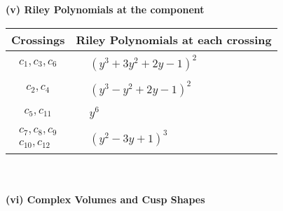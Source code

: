 \documentclass[1p]{elsarticle_modified}
\theoremstyle{definition}
\begin{document}
\newpage\renewcommand{\arraystretch}{1}
\flushleft \textbf{(v) Riley Polynomials at the component}\newline \\
\begin{tabular}{m{50pt}|m{274pt}}
Crossings & \hspace{64pt}Riley Polynomials at each crossing \\
\hline $$\begin{aligned}c_{1},c_{3},c_{6}\end{aligned}$$&$\begin{aligned}
&(y^3+3 y^2+2 y-1)^2
\end{aligned}$\\
\hline $$\begin{aligned}c_{2},c_{4}\end{aligned}$$&$\begin{aligned}
&(y^3- y^2+2 y-1)^2
\end{aligned}$\\
\hline $$\begin{aligned}c_{5},c_{11}\end{aligned}$$&$\begin{aligned}
&y^6
\end{aligned}$\\
\hline $$\begin{aligned}c_{7},c_{8},c_{9}\\c_{10},c_{12}\end{aligned}$$&$\begin{aligned}
&(y^2-3 y+1)^3
\end{aligned}$\\
\hline
\end{tabular}\\~\\
\newpage\flushleft \textbf{(vi) Complex Volumes and Cusp Shapes}
\end{document}
